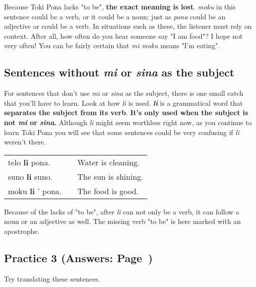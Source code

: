 Because Toki Pona lacks "to be", \textbf{the exact meaning is lost}. 
\textit{moku} in this sentence could be a verb, or it could be a noun; just as \textit{pona} could be an adjective or could be a verb. 
In situations such as these, the listener must rely on context. 
After all, how often do you hear someone say "I am food"? 
I hope not very often! You can be fairly certain that \textit{mi moku} means "I'm eating". 

\subsection*{Sentences without \textit{mi} or \textit{sina} as the subject}
%
For sentences that don't use \textit{mi} or \textit{sina} as the subject, there is one small catch that you'll have to learn. 
Look at how \textit{li} is used. 
\textbf{\textit{li}} is a grammatical word that \textbf{separates the subject from its verb}. 
\textbf{It's only used when the subject is not \textit{mi} or \textit{sina}.} 
Although \textit{li} might seem worthless right now, as you continue to learn Toki Pona you will see that some sentences could be very confusing if \textit{li} weren't there. 

\begin{supertabular}{p{5cm}|ll}
telo \textbf{li} pona. && Water is cleaning. \\
suno \textbf{li} suno. && The sun is shining. \\
moku \textbf{li} ' pona. && The food is good. \\ %
\end{supertabular} 

Because of the lacks of "to be", after \textit{li} can not only be a verb, it can follow a noun or an adjective as well.
The missing verb "to be" is here marked with an apostrophe. 
%
\subsection*{Practice 3 (Answers: Page~\pageref{'basic_sentences'})}
%
Try translating these sentences. 

